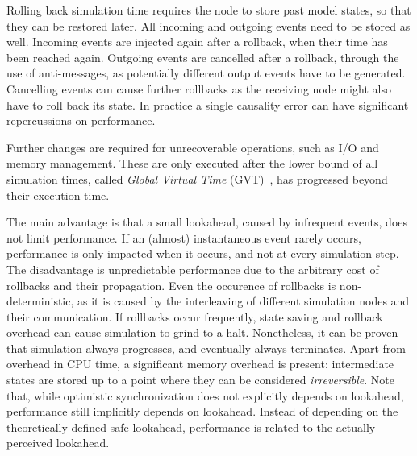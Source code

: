 Rolling back simulation time requires the node to store past model states, so that they can be restored later.
All incoming and outgoing events need to be stored as well.
Incoming events are injected again after a rollback, when their time has been reached again.
Outgoing events are cancelled after a rollback, through the use of anti-messages, as potentially different output events have to be generated.
Cancelling events can cause further rollbacks as the receiving node might also have to roll back its state.
In practice a single causality error can have significant repercussions on performance.

Further changes are required for unrecoverable operations, such as I/O and memory management.
These are only executed after the lower bound of all simulation times, called \textit{Global Virtual Time} (GVT)~\cite{FujimotoBook}, has progressed beyond their execution time.

The main advantage is that a small lookahead, caused by infrequent events, does not limit performance.
If an (almost) instantaneous event rarely occurs, performance is only impacted when it occurs, and not at every simulation step.
The disadvantage is unpredictable performance due to the arbitrary cost of rollbacks and their propagation.
Even the occurence of rollbacks is non-deterministic, as it is caused by the interleaving of different simulation nodes and their communication.
If rollbacks occur frequently, state saving and rollback overhead can cause simulation to grind to a halt.
Nonetheless, it can be proven that simulation always progresses, and eventually always terminates.
Apart from overhead in CPU time, a significant memory overhead is present: intermediate states are stored up to a point where they can be considered \textit{irreversible}.
Note that, while optimistic synchronization does not explicitly depends on lookahead, performance still implicitly depends on lookahead.
Instead of depending on the theoretically defined safe lookahead, performance is related to the actually perceived lookahead.
